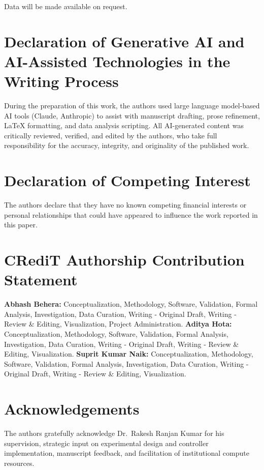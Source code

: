 \documentclass[3p,twocolumn]{elsarticle}
\theoremstyle{plain}%
\theoremstyle{definition}%
\begin{document}
Data will be made available on request.

\section*{Declaration of Generative AI and AI-Assisted Technologies in the Writing Process}

During the preparation of this work, the authors used large language model-based AI tools (Claude, Anthropic) to assist with manuscript drafting, prose refinement, LaTeX formatting, and data analysis scripting. All AI-generated content was critically reviewed, verified, and edited by the authors, who take full responsibility for the accuracy, integrity, and originality of the published work.

\section*{Declaration of Competing Interest}
The authors declare that they have no known competing financial interests or personal relationships that could have appeared to influence the work reported in this paper.

\section*{CRediT Authorship Contribution Statement}

\textbf{Abhash Behera:} Conceptualization, Methodology, Software, Validation, Formal Analysis, Investigation, Data Curation, Writing - Original Draft, Writing - Review \& Editing, Visualization, Project Administration.
\textbf{Aditya Hota:} Conceptualization, Methodology, Software, Validation, Formal Analysis, Investigation, Data Curation, Writing - Original Draft, Writing - Review \& Editing, Visualization.
\textbf{Suprit Kumar Naik:} Conceptualization, Methodology, Software, Validation, Formal Analysis, Investigation, Data Curation, Writing - Original Draft, Writing - Review \& Editing, Visualization.

\section*{Acknowledgements}
The authors gratefully acknowledge Dr.\ Rakesh Ranjan Kumar for his supervision, strategic input on experimental design and controller implementation, manuscript feedback, and facilitation of institutional compute resources.





\end{document}
